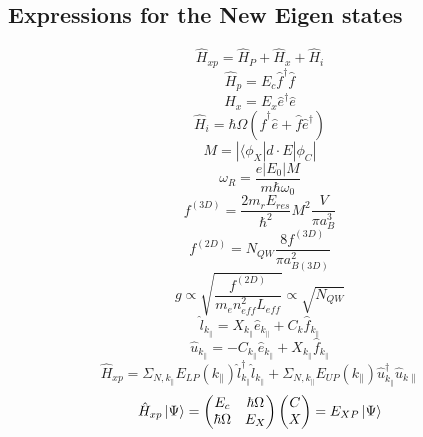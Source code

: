 \documentclass{article}
\begin{document}
\subsection{Expressions for the New Eigen states}
\begin{equation*}
    \hat{H}_{xp}=\hat{H}_P+\hat{H}_x+\hat{H}_i
\end{equation*}
\begin{equation*}
    \hat{H}_p=E_c\hat{f}^\dagger \hat{f}
\end{equation*}
\begin{equation*}
    \hat{H}_x=E_x\hat{e}^\dagger \hat{e}
\end{equation*}
\begin{equation*}
    \hat{H}_i=\hbar \Omega (\hat{f}^\dagger \hat{e} + \hat{f} \hat{e}^\dagger)
\end{equation*}
\begin{equation*}
    M=|\langle \phi _X|d\cdot E | \phi_C|
\end{equation*}
\begin{equation*}
    \omega_R=\frac{e|E_0|M}{m\hbar\omega_0}
\end{equation*}
\begin{equation*}
    f^{(3D)}=\frac{2m_rE_{res}}{\hbar^2} M^2 \frac{V}{\pi a^3_B}
\end{equation*}
\begin{equation*}
    f^{(2D)}=N_{QW}\frac{8f^{(3D)}}{\pi a^2_{B(3D)}}
\end{equation*}
\begin{equation*}
    g \propto \sqrt{\frac{f^{(2D)}}{m_e n^2_{eff} L_{eff}}} \propto \sqrt{N_{QW}}
\end{equation*}
\begin{equation*}
    \hat{l}_{k_\parallel}=X_{k_\parallel}\hat{e}_{k_\parallel} + C_k\hat{f}_{k_\parallel}
\end{equation*}
\begin{equation*}
    \hat{u}_{k_\parallel}=-C_{k_\parallel}\hat{e}_{k_\parallel}+X_{k_\parallel}\hat{f}_{k_\parallel}
\end{equation*}
\begin{equation*}
    \hat{H}_{xp}=\Sigma_{N,{k_\parallel}}E_{LP}({k_\parallel})\hat{l}^\dagger_{k_\parallel}\hat{l}_{k_\parallel}
    + \Sigma_{N,{k_\parallel}} E_{UP}(k_\parallel)\hat{u}_{k_\parallel}^\dagger \hat{u}_{k\parallel} 
\end{equation*}
\begin{equation*}
    \hat{H}_{xp} \ket{\Psi} = 
    \begin{pmatrix}
        E_c & \hbar\Omega \\
        \hbar\Omega & E_X
    \end{pmatrix}
    \begin{pmatrix}
        C \\
        X
    \end{pmatrix}
    = E_{XP}\ket{\Psi}
\end{equation*}
\end{document}
